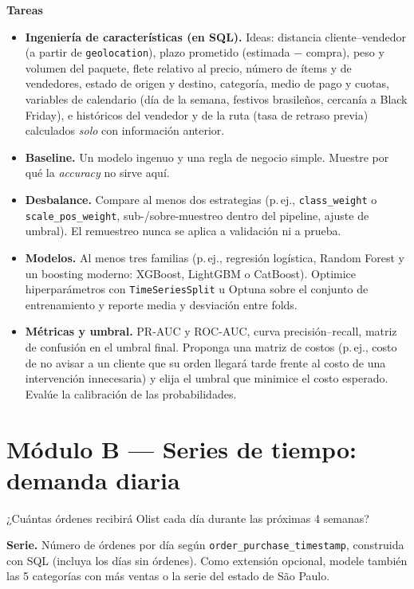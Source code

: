 \documentclass[11pt,letterpaper]{article}
\newcommand{\tabla}[1]{\texttt{#1}}
\begin{document}
\textbf{Tareas}
\begin{itemize}
  \item \textbf{Ingeniería de características (en SQL).} Ideas: distancia cliente--vendedor (a partir de \tabla{geolocation}), plazo prometido (estimada $-$ compra), peso y volumen del paquete, flete relativo al precio, número de ítems y de vendedores, estado de origen y destino, categoría, medio de pago y cuotas, variables de calendario (día de la semana, festivos brasileños, cercanía a Black Friday), e históricos del vendedor y de la ruta (tasa de retraso previa) calculados \emph{solo} con información anterior.
  \item \textbf{Baseline.} Un modelo ingenuo y una regla de negocio simple. Muestre por qué la \emph{accuracy} no sirve aquí.
  \item \textbf{Desbalance.} Compare al menos dos estrategias (p.\,ej., \texttt{class\_weight} o \texttt{scale\_pos\_weight}, sub-/sobre-muestreo dentro del pipeline, ajuste de umbral). El remuestreo nunca se aplica a validación ni a prueba.
  \item \textbf{Modelos.} Al menos tres familias (p.\,ej., regresión logística, Random Forest y un boosting moderno: XGBoost, LightGBM o CatBoost). Optimice hiperparámetros con \texttt{TimeSeriesSplit} u Optuna sobre el conjunto de entrenamiento y reporte media y desviación entre folds.
  \item \textbf{Métricas y umbral.} PR-AUC y ROC-AUC, curva precisión--recall, matriz de confusión en el umbral final. Proponga una matriz de costos (p.\,ej., costo de no avisar a un cliente que su orden llegará tarde frente al costo de una intervención innecesaria) y elija el umbral que minimice el costo esperado. Evalúe la calibración de las probabilidades.
\end{itemize}

\section{Módulo B — Series de tiempo: demanda diaria}

\begin{questionbox}
  ¿Cuántas órdenes recibirá Olist cada día durante las próximas 4 semanas?
\end{questionbox}

\textbf{Serie.} Número de órdenes por día según \tabla{order\_purchase\_timestamp}, construida con SQL (incluya los días sin órdenes). Como extensión opcional, modele también las 5 categorías con más ventas o la serie del estado de São Paulo.
\end{document}
